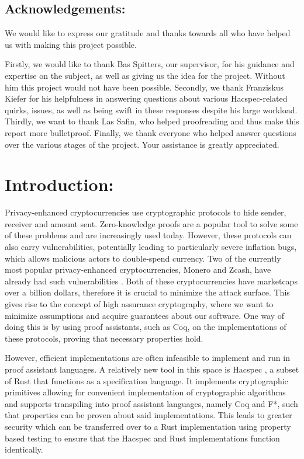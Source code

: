 \documentclass{article}
\begin{document}
\subsection*{Acknowledgements:}

We would like to express our gratitude and thanks towards all who have
helped us with making this project possible.

Firstly, we would like to thank Bas Spitters, our supervisor,
for his guidance and expertise on the subject, as well as giving
us the idea for the project. Without him this project would not
have been possible. Secondly, we thank Franziskus Kiefer for his
helpfulness in answering questions about various Hacspec-related
quirks, issues, as well as being swift in these responses despite
his large workload. Thirdly, we want to thank Las Safin, who helped
proofreading and thus make this report more bulletproof. Finally, we
thank everyone who helped answer questions over the various stages of
the project. Your assistance is greatly appreciated.

\newpage
\tableofcontents

\newpage


\section{Introduction:} \label{Introduction}

Privacy-enhanced cryptocurrencies use cryptographic protocols to
hide sender, receiver and amount sent. Zero-knowledge proofs are a
popular tool to solve some of these problems and are increasingly
used today. However, these protocols can also carry vulnerabilities,
potentially leading to particularly severe inflation bugs, which allows
malicious actors to double-spend currency. Two of the currently most
popular privacy-enhanced cryptocurrencies, Monero and Zcash, have
already had such vulnerabilities \cite{cryptonote} \cite{zcash}. Both
of these cryptocurrencies have marketcaps over a billion dollars,
therefore it is crucial to minimize the attack surface. This gives rise
to the concept of high assurance cryptography, where we want to minimize
assumptions and acquire guarantees about our software. One way of doing
this is by using proof assistants, such as Coq, on the implementations
of these protocols, proving that necessary properties hold.

However, efficient implementations are often infeasible to implement
and run in proof assistant languages. A relatively new tool in this
space is Hacspec \cite{hacspec}, a subset of Rust that functions
as a specification language. It implements cryptographic primitives
allowing for convenient implementation of cryptographic algorithms and
supports transpiling into proof assistant languages, namely Coq and F*,
such that properties can be proven about said implementations. This
leads to greater security which can be transferred over to a Rust
implementation using property based testing to ensure that the Hacspec
and Rust implementations function identically.
\end{document}
